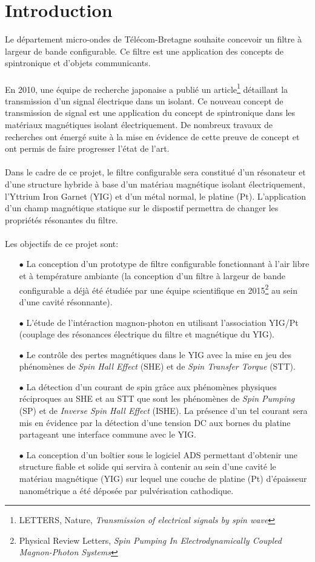 \documentclass[12pt,fleqn]{book} %
\begin{document}
\part{Introduction}
Le département micro-ondes de Télécom-Bretagne souhaite concevoir un filtre à
largeur de bande configurable. Ce filtre est une application des concepts de spintronique et d’objets communicants.
~\\\\En 2010, une équipe de recherche japonaise a publié un article\footnote{LETTERS, Nature, \emph{Transmission of electrical signals by spin wave}} détaillant la transmission d’un signal électrique dans un isolant. Ce nouveau concept de transmission de
signal est une application du concept de spintronique dans les matériaux magnétiques
isolant électriquement. De nombreux travaux de recherches ont émergé suite à la mise
en évidence de cette preuve de concept et ont permis de faire progresser l’état de l’art.
~\\\\Dans le cadre de ce projet, le filtre configurable sera constitué d’un résonateur et d’une
structure hybride à base d’un matériau magnétique isolant électriquement, l’Yttrium
Iron Garnet (YIG) et d’un métal normal, le platine (Pt). L’application d’un champ
magnétique statique sur le dispostif permettra de changer les propriétés résonantes du
filtre.
~\\\\Les objectifs de ce projet sont:
~\\
\begin{itemize}
 \item[$\bullet$] La conception d'un prototype de filtre configurable fonctionnant à l'air libre et à température ambiante (la conception d'un filtre à largeur de bande configurable a déjà été étudiée par une équipe scientifique en 2015\footnote{Physical Review Letters, \emph{Spin Pumping In Electrodynamically Coupled Magnon-Photon Systems}} au sein d'une cavité résonnante).
 \item[$\bullet$] L'étude de l'intéraction magnon-photon en utilisant l'association YIG/Pt (couplage des résonances électrique du filtre et magnétique du YIG).
 \item[$\bullet$] Le contrôle des pertes magnétiques dans le YIG avec la mise en jeu des phénomènes de \emph{Spin Hall Effect} (SHE) et de \emph{Spin Transfer Torque} (STT).
 \item[$\bullet$] La détection d’un courant de spin grâce aux phénomènes physiques réciproques au SHE et au STT que sont les phénomènes de \emph{Spin Pumping} (SP) et de \emph{Inverse Spin Hall Effect} (ISHE). La présence d'un tel courant sera mis en évidence par la détection d'une tension DC aux bornes du platine partageant une interface commune avec le YIG.
 \item[$\bullet$] La conception d’un boîtier sous le logiciel ADS permettant d’obtenir une structure fiable et solide qui servira à contenir au sein d’une cavité le matériau magnétique (YIG) sur lequel
une couche de platine (Pt) d’épaisseur nanométrique a été déposée par pulvérisation
cathodique.
\end{itemize}
\setcounter{chapter}{1}
\end{document}
